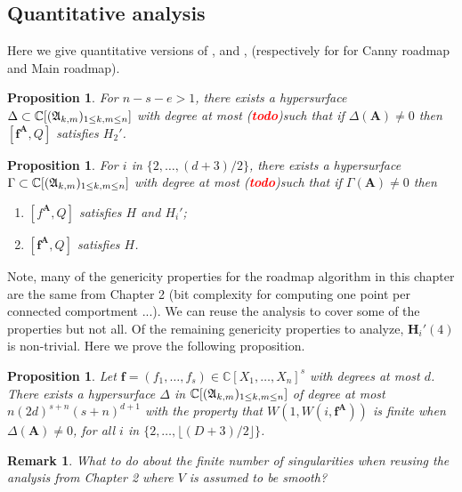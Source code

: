 \documentclass[12pt]{article}
\def\mA{{\bm A}}
\def\C{\mathbb{C}}
\def\td{(\textcolor{red}{{\bf todo}})}
\newtheorem{prop}[theorem]{Proposition}
\newtheorem{remark}[theorem]{Remark}
\def\mA{{\bm A}}
\def\C{\mathbb{C}}
\def\td{(\textcolor{red}{{\bf todo}})}
\begin{document}
\subsection{Quantitative analysis}
Here we give quantitative versions of \cite[Lemma 31]{SchostMohabBabySteps2011}, and \cite[Lemma 34]{SchostMohabBabySteps2011}, (respectively for for Canny roadmap and Main roadmap). 
%
\begin{prop}\label{prop:QuantGenIEqualTwo}
For $n-s-e>1$, there exists a hypersurface $\Delta \subset \C[(\frak{A}_{k,m})_{1 \le k,m \le n}]$ with degree at most \td such that if $\Delta(\mA) \not = 0$ then $[\bm f^\mA,Q]$ satisfies $H_2'$.
\end{prop}
%
\begin{prop}\label{prop:QuantGenIGreaterThanTwo}
For $i$ in $\{2,\hdots,(d+3)/2\}$, there exists a hypersurface $\Gamma \subset \C[(\frak{A}_{k,m})_{1 \le k,m \le n}]$ with degree at most \td such that if $\Gamma(\mA) \not = 0$ then 
\begin{enumerate}
    \item $[f^\mA,Q]$ satisfies $H$ and $H_i'$;
    \item $[\bm f^\mA,Q]$ satisfies $H$.
\end{enumerate}
\end{prop}
%
Note, many of the genericity properties for the roadmap algorithm in this chapter are the same from Chapter 2 (bit complexity for computing one point per connected comportment ...). We can reuse the analysis to cover some of the properties but not all. Of the remaining genericity properties to analyze, $\bm H_i'(4)$ is non-trivial. Here we prove the following proposition. 
%
\begin{prop}\label{prop:finitenessPolarVarietyOfPolarVariety}
Let $\bm{f} = (f_1,\hdots,f_s)  \in \C[X_1,\hdots,X_n]^s$ with degrees at most $d$. There exists a hypersurface $\Delta$ in $\C[(\frak{A}_{k,m})_{1 \le k,m \le n}]$ of degree at most $n(2d)^{s+n}(s+n)^{d+1}$ with the property that $W(1,W(i,\bm{f}^\mA))$ is finite when $\Delta(\mA) \neq 0$, for all $i$ in $\{2,\hdots,\lfloor (D+3)/2 \rfloor\}$.
%
\end{prop}

\color{red}
\begin{remark}
    What to do about the finite number of singularities when reusing the analysis from Chapter 2 where $V$ is assumed to be smooth?
\end{remark}
\color{black}
\end{document}
